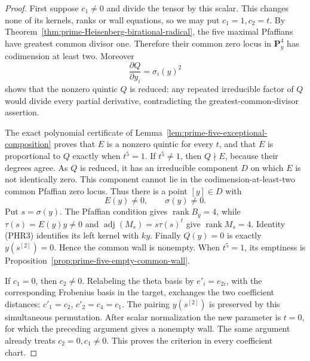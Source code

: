 \begin{proof}
First suppose \(c_1\ne0\) and divide the tensor by this scalar.
This changes none of its kernels, ranks or wall equations, so we
may put \(c_1=1,c_2=t\).  By
Theorem~\ref{thm:prime-Heisenberg-birational-radical}, the five
maximal Pfaffians have greatest common divisor one.  Therefore
their common zero locus in \(\mathbf P^4_y\) has codimension at
least two.  Moreover
\[
        \frac{\partial Q}{\partial y_i}=\sigma_i(y)^2
                                                        \tag{PAE2}
\]
shows that the nonzero quintic \(Q\) is reduced: any repeated
irreducible factor of \(Q\) would divide every partial derivative,
contradicting the greatest-common-divisor assertion.

The exact polynomial certificate of
Lemma~\ref{lem:prime-five-exceptional-composition} proves that
\(E\) is a nonzero quintic for every \(t\), and that
\(E\) is proportional to \(Q\) exactly when \(t^5=1\).
If \(t^5\ne1\), then \(Q\nmid E\), because their degrees
agree.  As \(Q\) is reduced, it has an irreducible component
\(D\) on which \(E\) is not identically zero.  This component
cannot lie in the codimension-at-least-two common Pfaffian zero
locus.  Thus there is a point \([y]\in D\) with
\[
              E(y)\ne0,\qquad \sigma(y)\ne0.       \tag{PAE3}
\]
Put \(s=\sigma(y)\).  The Pfaffian condition gives
\(\operatorname{rank}B_y=4\), while
\(\tau(s)=E(y)y\ne0\) and
\(\operatorname{adj}(M_s)=s\tau(s)^t\) give
\(\operatorname{rank}M_s=4\).  Identity (PHR3) identifies its
left kernel with \(ky\).  Finally \(Q(y)=0\) is exactly
\(y(s^{[2]})=0\).  Hence the common wall is nonempty.
When \(t^5=1\), its emptiness is
Proposition~\ref{prop:prime-five-empty-common-wall}.

If \(c_1=0\), then \(c_2\ne0\).  Relabeling the theta basis
by \(e'_i=e_{2i}\), with the corresponding Frobenius basis in
the target, exchanges the two coefficient distances:
\(c'_1=c_2\), \(c'_2=c_{4}=c_1\).  The pairing
\(y(s^{[2]})\) is preserved by this simultaneous permutation.
After scalar normalization the new parameter is \(t=0\), for
which the preceding argument gives a nonempty wall.  The same
argument already treats \(c_2=0,c_1\ne0\).  This proves the
criterion in every coefficient chart.
\end{proof}

